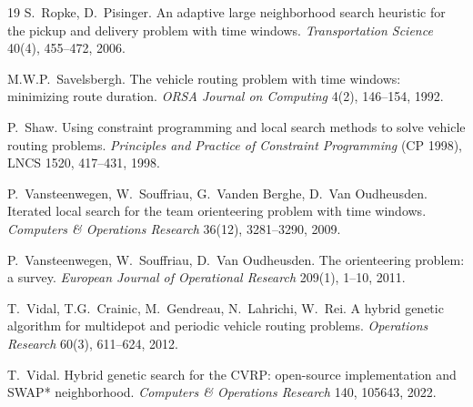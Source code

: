 \documentclass[10pt, a4paper]{article}
\begin{document}
\begin{thebibliography}{19}
 S.~Ropke, D.~Pisinger. An adaptive large neighborhood
search heuristic for the pickup and delivery problem with time windows.
\emph{Transportation Science} 40(4), 455--472, 2006.

 M.W.P.~Savelsbergh. The vehicle routing problem
with time windows: minimizing route duration.
\emph{ORSA Journal on Computing} 4(2), 146--154, 1992.

 P.~Shaw. Using constraint programming and local search
methods to solve vehicle routing problems. \emph{Principles and Practice of
Constraint Programming} (CP 1998), LNCS 1520, 417--431, 1998.

 P.~Vansteenwegen, W.~Souffriau,
G.~Vanden Berghe, D.~Van Oudheusden. Iterated local search for the team
orienteering problem with time windows.
\emph{Computers \& Operations Research} 36(12), 3281--3290, 2009.

 P.~Vansteenwegen, W.~Souffriau,
D.~Van Oudheusden. The orienteering problem: a survey.
\emph{European Journal of Operational Research} 209(1), 1--10, 2011.

 T.~Vidal, T.G.~Crainic, M.~Gendreau, N.~Lahrichi,
W.~Rei. A hybrid genetic algorithm for multidepot and periodic vehicle
routing problems. \emph{Operations Research} 60(3), 611--624, 2012.

 T.~Vidal. Hybrid genetic search for the CVRP:
open-source implementation and SWAP* neighborhood.
\emph{Computers \& Operations Research} 140, 105643, 2022.

\end{thebibliography}
\end{document}
